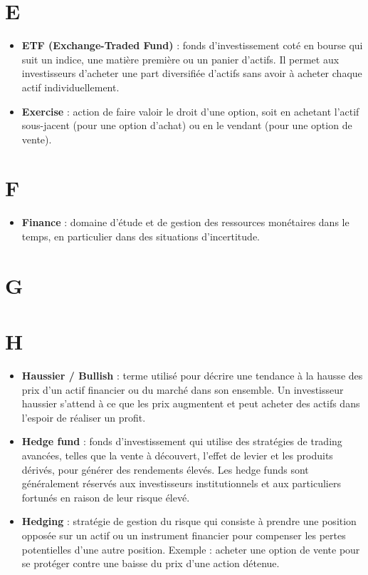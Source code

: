 \documentclass[a4paper,10pt]{article}
\begin{document}
\begin{multicols}{2}
\section*{E}
\begin{itemize}
  \item \textbf{ETF (Exchange-Traded Fund)} : fonds d’investissement coté en bourse qui suit un indice, une matière première ou un panier d’actifs. Il permet aux investisseurs d’acheter une part diversifiée d’actifs sans avoir à acheter chaque actif individuellement.
  \item \textbf{Exercise} : action de faire valoir le droit d’une option, soit en achetant l’actif sous-jacent (pour une option d’achat) ou en le vendant (pour une option de vente).
\end{itemize}

\section*{F}
\begin{itemize}
  \item \textbf{Finance} : domaine d’étude et de gestion des ressources monétaires dans le temps, en particulier dans des situations d’incertitude.
\end{itemize}

\section*{G}

\section*{H}
\begin{itemize}
  \item \textbf{Haussier / Bullish} : terme utilisé pour décrire une tendance à la hausse des prix d’un actif financier ou du marché dans son ensemble. Un investisseur haussier s’attend à ce que les prix augmentent et peut acheter des actifs dans l’espoir de réaliser un profit.
  \item \textbf{Hedge fund} : fonds d’investissement qui utilise des stratégies de trading avancées, telles que la vente à découvert, l’effet de levier et les produits dérivés, pour générer des rendements élevés. Les hedge funds sont généralement réservés aux investisseurs institutionnels et aux particuliers fortunés en raison de leur risque élevé.
  \item \textbf{Hedging} : stratégie de gestion du risque qui consiste à prendre une position opposée sur un actif ou un instrument financier pour compenser les pertes potentielles d’une autre position. Exemple : acheter une option de vente pour se protéger contre une baisse du prix d’une action détenue.
\end{itemize}


\end{multicols}
\end{document}

